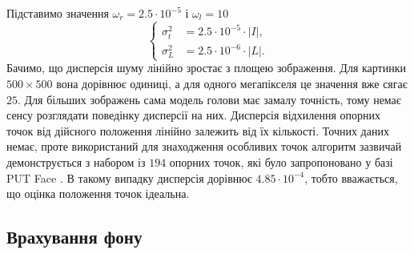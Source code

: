 Підставимо значення $\omega_r = 2.5 \cdot 10^{-5}$ і $\omega_l = 10$
\begin{equation*}
  \begin{cases}
    \sigma^2_t &= 2.5 \cdot 10^{-5} \cdot \left| I \right|, \\
    \sigma_L^2 &= 2.5 \cdot 10^{-6} \cdot \left| L \right|.
  \end{cases}
\end{equation*}
Бачимо,
що дисперсія шуму лінійно зростає з площею зображення.
Для картинки $500 \times 500$ вона дорівнює одиниці,
а для одного мегапікселя це значення вже сягає $25$.
Для більших зображень сама модель голови має замалу точність,
тому немає сенсу розглядати поведінку дисперсії на них.
Дисперсія відхилення опорних точок від дійсного положення
лінійно залежить від їх кількості.
Точних даних немає,
проте використаний для знаходження особливих точок алгоритм
зазвичай демонструється з набором із $194$ опорних точок,
які було запропоновано у базі PUT Face \cite{put-face:2008}.
В такому випадку дисперсія дорівнює $4.85 \cdot 10^{-4}$,
тобто вважається, що оцінка положення точок ідеальна.

\subsection{Врахування фону}


